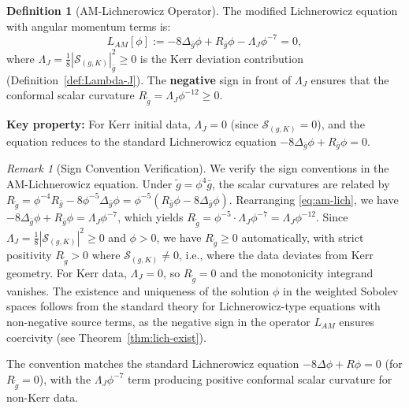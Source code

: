 \documentclass[12pt]{article}
\theoremstyle{plain}
\theoremstyle{definition}
\newtheorem{definition}[theorem]{Definition}
\theoremstyle{remark}
\newtheorem{remark}[theorem]{Remark}
\newcommand{\tg}{\tilde{g}}
\newcommand{\bg}{\bar{g}}
\begin{document}
\begin{definition}[AM-Lichnerowicz Operator]\label{def:am-lich}
The modified Lichnerowicz equation with angular momentum terms is:
\begin{equation}\label{eq:am-lich}
L_{AM}[\phi] := -8\Delta_{\bg}\phi + R_{\bg}\phi - \Lambda_J \phi^{-7} = 0,
\end{equation}
where $\Lambda_J = \frac{1}{8}|\mathcal{S}_{(g,K)}|^2_{\bg} \geq 0$ is the Kerr deviation contribution (Definition~\ref{def:Lambda-J}). The \textbf{negative} sign in front of $\Lambda_J$ ensures that the conformal scalar curvature $R_{\tg} = \Lambda_J \phi^{-12} \geq 0$.

\textbf{Key property:} For Kerr initial data, $\Lambda_J = 0$ (since $\mathcal{S}_{(g,K)} = 0$), and the equation reduces to the standard Lichnerowicz equation $-8\Delta_{\bg}\phi + R_{\bg}\phi = 0$.
\end{definition}

\begin{remark}[Sign Convention Verification]\label{rem:sign-verification}
We verify the sign conventions in the AM-Lichnerowicz equation. Under $\tg = \phi^4 \bg$, the scalar curvatures are related by $R_{\tg} = \phi^{-4} R_{\bg} - 8\phi^{-5}\Delta_{\bg}\phi = \phi^{-5}(R_{\bg}\phi - 8\Delta_{\bg}\phi)$. Rearranging \eqref{eq:am-lich}, we have $-8\Delta_{\bg}\phi + R_{\bg}\phi = \Lambda_J \phi^{-7}$, which yields $R_{\tg} = \phi^{-5} \cdot \Lambda_J \phi^{-7} = \Lambda_J \phi^{-12}$. Since $\Lambda_J = \frac{1}{8}|\mathcal{S}_{(g,K)}|^2 \geq 0$ and $\phi > 0$, we have $R_{\tg} \geq 0$ automatically, with strict positivity $R_{\tg} > 0$ where $\mathcal{S}_{(g,K)} \neq 0$, i.e., where the data deviates from Kerr geometry. For Kerr data, $\Lambda_J = 0$, so $R_{\tg} = 0$ and the monotonicity integrand vanishes. The existence and uniqueness of the solution $\phi$ in the weighted Sobolev spaces follows from the standard theory for Lichnerowicz-type equations with non-negative source terms, as the negative sign in the operator $L_{AM}$ ensures coercivity (see Theorem~\ref{thm:lich-exist}).

The convention matches the standard Lichnerowicz equation $-8\Delta\phi + R\phi = 0$ (for $R_{\tg} = 0$), with the $\Lambda_J \phi^{-7}$ term producing positive conformal scalar curvature for non-Kerr data.
\end{remark}
\end{document}

